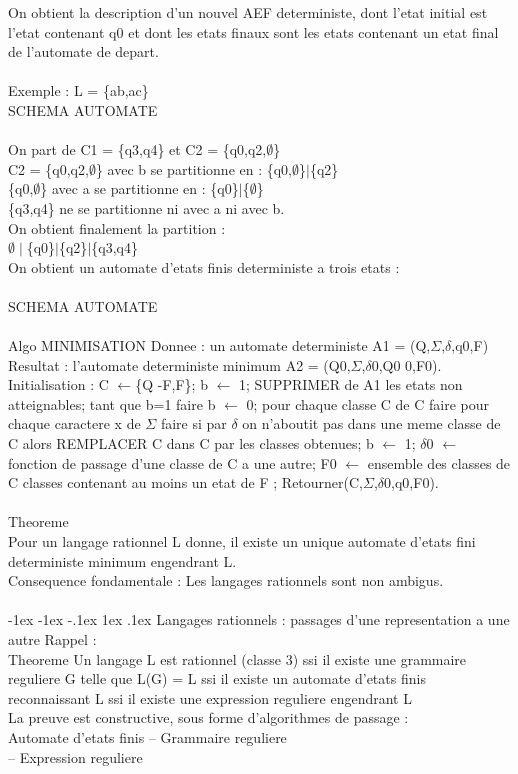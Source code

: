\documentclass[5pt]{article}
\makeatletter
\renewcommand{\subsection}{\@startsection {section}{1}{\z@}%
             {-1ex \@plus -1ex \@minus -.1ex}%
             {1ex \@plus.1ex}%
             {\normalfont\small\sffamily\bfseries}}
\makeatother
\begin{document}
\begin{scriptsize}
On obtient la description d’un nouvel AEF deterministe, dont l’etat initial est l’etat contenant q0 et dont les etats finaux sont les etats contenant un etat final de l’automate de depart.\\
\\
Exemple : L = \{ab,ac\}\\
SCHEMA AUTOMATE\\
\\
On part de C1 = \{q3,q4\} et C2 = \{q0,q2,$\emptyset$\}\\
C2 = \{q0,q2,$\emptyset$\} avec b se partitionne en : \{q0,$\emptyset$\}$\mid$\{q2\}\\
\{q0,$\emptyset$\} avec a se partitionne en : \{q0\}$\mid$\{$\emptyset$\}\\
\{q3,q4\} ne se partitionne ni avec a ni avec b.\\
On obtient finalement la partition :\\
$\emptyset\mid$\{q0\}$\mid$\{q2\}$\mid$\{q3,q4\}\\
On obtient un automate d’etats finis deterministe a trois etats :\\
\\
SCHEMA AUTOMATE\\
\\
Algo MINIMISATION Donnee : un automate deterministe A1 = (Q,$\Sigma$,$\delta$,q0,F) Resultat : l’automate deterministe minimum A2 = (Q0,$\Sigma$,$\delta$0,Q0 0,F0). Initialisation : C $\leftarrow$\{Q -F,F\}; b $\leftarrow$ 1; SUPPRIMER de A1 les etats non atteignables; tant que b=1 faire b $\leftarrow$ 0; pour chaque classe C de C faire pour chaque caractere x de $\Sigma$ faire si par $\delta$ on n’aboutit pas dans une meme classe de C alors REMPLACER C dans C par les classes obtenues; b $\leftarrow$ 1; $\delta$0 $\leftarrow$ fonction de passage d’une classe de C a une autre; F0 $\leftarrow$ ensemble des classes de C classes contenant au moins un etat de F ; Retourner(C,$\Sigma$,$\delta$0,q0,F0).\\
\\
Theoreme\\
Pour un langage rationnel L donne, il existe un unique automate d’etats fini deterministe minimum engendrant L.\\
Consequence fondamentale : Les langages rationnels sont non ambigus.\\
\\
\subsection{Langages rationnels : passages d’une representation a une autre}
Rappel :\\
Theoreme Un langage L est rationnel (classe 3) ssi il existe une grammaire reguliere G telle que L(G) = L ssi il existe un automate d’etats finis reconnaissant L ssi il existe une expression reguliere engendrant L\\
La preuve est constructive, sous forme d’algorithmes de passage :\\
Automate d’etats finis -- Grammaire reguliere\\
-- Expression reguliere\\

\end{scriptsize}
\end{document}
